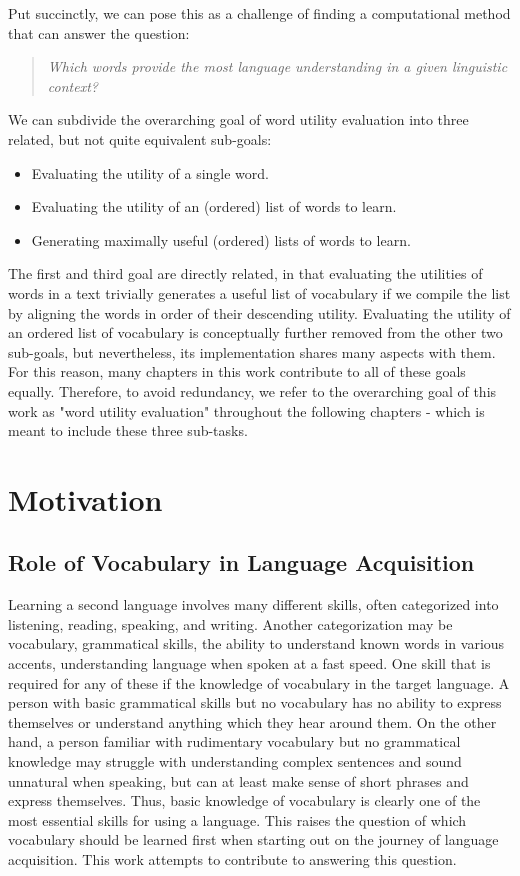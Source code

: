 
Put succinctly, we can pose this as a challenge of finding a computational method that can answer the question:

\begin{quote}
	\textit{Which words provide the most language understanding in a given linguistic context?}
\end{quote}

We can subdivide the overarching goal of word utility evaluation into three related, but not quite equivalent sub-goals:
\begin{itemize}
	\item Evaluating the utility of a single word.
	\item Evaluating the utility of an (ordered) list of words to learn.
	\item Generating maximally useful (ordered) lists of words to learn.
\end{itemize}

The first and third goal are directly related, in that evaluating the utilities of words in a text trivially generates a useful list of vocabulary if we compile the list by aligning the words in order of their descending utility. 
Evaluating the utility of an ordered list of vocabulary is conceptually further removed from the other two sub-goals, but nevertheless, its implementation shares many aspects with them.
For this reason, many chapters in this work contribute to all of these goals equally.
Therefore, to avoid redundancy, we refer to the overarching goal of this work as "word utility evaluation" throughout the following chapters - which is meant to include these three sub-tasks.



\section{Motivation}
\subsection{Role of Vocabulary in Language Acquisition}
Learning a second language involves many different skills, often categorized into listening, reading, speaking, and writing.
Another categorization may be vocabulary, grammatical skills, the ability to understand known words in various accents, understanding language when spoken at a fast speed.
One skill that is required for any of these if the knowledge of vocabulary in the target language.
A person with basic grammatical skills but no vocabulary has no ability to express themselves or understand anything which they hear around them.
On the other hand, a person familiar with rudimentary vocabulary but no grammatical knowledge may struggle with understanding complex sentences and sound unnatural when speaking, but can at least make sense of short phrases and express themselves.
Thus, basic knowledge of vocabulary is clearly one of the most essential skills for using a language.
This raises the question of which vocabulary should be learned first when starting out on the journey of language acquisition.
This work attempts to contribute to answering this question.

